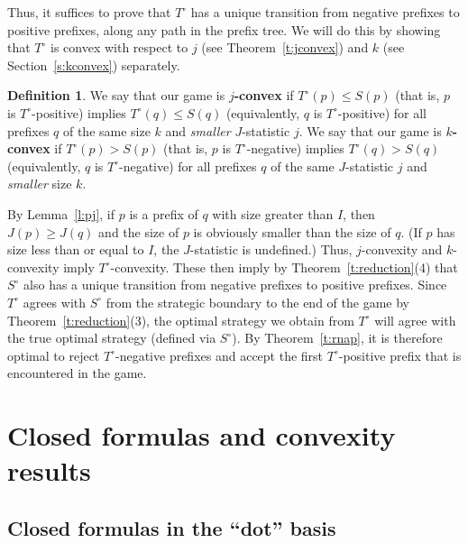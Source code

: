 \documentclass[11pt]{amsart}   %
\theoremstyle{definition}
\newtheorem{definition}[theorem]{Definition}
\theoremstyle{remark}
\numberwithin{equation}{section}
\theoremstyle{theorem}
\begin{document}
Thus, it suffices to prove that $T^\circ$ has a unique transition from negative
prefixes to positive prefixes, along any path in the prefix tree.  We will do
this by showing that $T^\circ$ is convex with respect to $j$ (see
Theorem~\ref{t:jconvex}) and $k$ (see Section~\ref{s:kconvex}) separately.

\begin{definition}\label{d:conv}
We say that our game is {\bf $j$-convex} if $T^\circ(p) \leq S(p)$ (that is, $p$ is $T^\circ$-positive) implies $T^\circ(q) \leq S(q)$ (equivalently, $q$ is $T^\circ$-positive) for all prefixes $q$ of the same size $k$ and {\em smaller} $J$-statistic $j$.  We say that our game is {\bf $k$-convex} if $T^\circ(p) > S(p)$ (that is, $p$ is $T^\circ$-negative) implies $T^\circ(q) > S(q)$ (equivalently, $q$ is $T^\circ$-negative) for all prefixes $q$ of the same $J$-statistic $j$ and {\em smaller} size $k$.
\end{definition}

By Lemma~\ref{l:pj}, if $p$ is a prefix of $q$ with size greater than $I$, then
$J(p) \geq J(q)$ and the size of $p$ is obviously smaller than the size of $q$.
(If $p$ has size less than or equal to $I$, the $J$-statistic is undefined.)
Thus, $j$-convexity and $k$-convexity imply $T^\circ$-convexity.  These then
imply by Theorem~\ref{t:reduction}(4) that $S^\circ$ also has a unique
transition from negative prefixes to positive prefixes.  Since $T^\circ$ agrees
with $S^\circ$ from the strategic boundary to the end of the game by
Theorem~\ref{t:reduction}(3), the optimal strategy we obtain from $T^\circ$
will agree with the true optimal strategy (defined via $S^\circ$).  By
Theorem~\ref{t:rnap}, it is therefore optimal to reject $T^\circ$-negative
prefixes and accept the first $T^\circ$-positive prefix that is encountered in
the game.


\bigskip
\section{Closed formulas and convexity results}\label{s:5}

\bigskip
\subsection{Closed formulas in the ``dot'' basis}\label{ss:dot}
\end{document}
